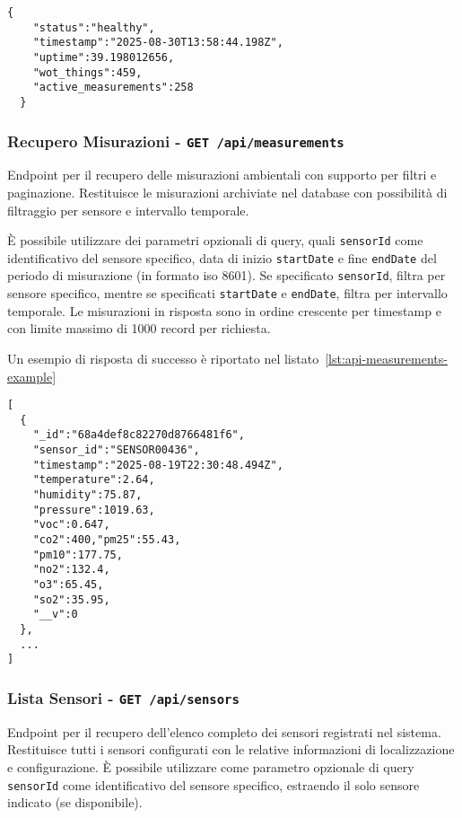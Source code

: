 \begin{lstlisting}[caption={Risposta di sucesso per endpoint \texttt{health}}, label=lst:api-health-example]
  {
    "status":"healthy",
    "timestamp":"2025-08-30T13:58:44.198Z",
    "uptime":39.198012656,
    "wot_things":459,
    "active_measurements":258
  }
\end{lstlisting}

\subsubsection{Recupero Misurazioni - \texttt{GET /api/measurements}}

Endpoint per il recupero delle misurazioni ambientali con supporto per filtri e paginazione.
Restituisce le misurazioni archiviate nel database con possibilità di filtraggio per sensore e intervallo temporale.

È possibile utilizzare dei parametri opzionali di query, quali
\texttt{sensorId} come identificativo del sensore specifico,
data di inizio \texttt{startDate} e fine \texttt{endDate} del periodo di misurazione (in formato \acrshort{iso} 8601).
Se specificato \texttt{sensorId}, filtra per sensore specifico,
mentre se specificati \texttt{startDate} e \texttt{endDate}, filtra per intervallo temporale.
Le misurazioni in risposta sono in ordine crescente per timestamp e con limite massimo di 1000 record per richiesta.

Un esempio di risposta di successo è riportato nel listato~\ref{lst:api-measurements-example}
\begin{lstlisting}[caption={Risposta di sucesso per endpoint \texttt{measurements}},label=lst:api-measurements-example]
[
  {
    "_id":"68a4def8c82270d8766481f6",
    "sensor_id":"SENSOR00436",
    "timestamp":"2025-08-19T22:30:48.494Z",
    "temperature":2.64,
    "humidity":75.87,
    "pressure":1019.63,
    "voc":0.647,
    "co2":400,"pm25":55.43,
    "pm10":177.75,
    "no2":132.4,
    "o3":65.45,
    "so2":35.95,
    "__v":0
  },
  ...
]
\end{lstlisting}

\subsubsection{Lista Sensori - \texttt{GET /api/sensors}}

Endpoint per il recupero dell'elenco completo dei sensori registrati nel sistema.
Restituisce tutti i sensori configurati con le relative informazioni di localizzazione e configurazione.
È possibile utilizzare come parametro opzionale di query \texttt{sensorId} come identificativo del sensore specifico,
estraendo il solo sensore indicato (se disponibile).

